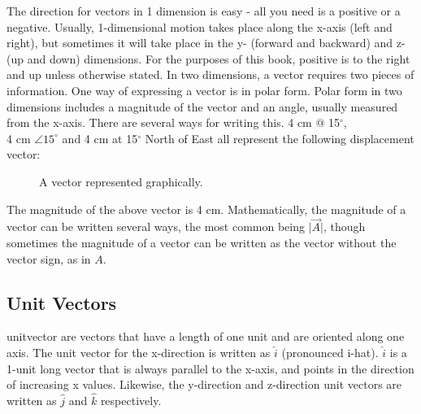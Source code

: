 The direction for vectors in 1 dimension is easy - all you need is a positive or a negative.  Usually, 1-dimensional motion takes place along the x-axis (left and right), but sometimes it will take place in the y- (forward and backward) and z- (up and down) dimensions.  For the purposes of this book, positive is to the right and up unless otherwise stated. 
In two dimensions, a vector requires two pieces of information.  One way of expressing a vector is in polar form.  Polar form in two dimensions includes a magnitude of the vector and an angle, usually measured from the x-axis.  There are several ways for writing this.  4 cm @ 15$^\circ$, \\ 4 cm $\angle 15^\circ$ and 4 cm at 15$^\circ$ North of East all represent the following displacement vector:



\begin{figure}[h]
	\caption{A vector represented graphically.} \label{figure:M1}
	\centering
	
\end{figure}


	
	
	



	
	The magnitude of the above vector is 4 cm.  Mathematically, the magnitude of a vector can be written several ways, the most common being $\lvert \vec{A} \rvert$, though sometimes the magnitude of a vector can be written as the vector without the vector sign, as in $A$. 
	
	\subsection{Unit Vectors}
	\gls{unitvector} are vectors that have a length of one unit and are oriented along one axis.  The unit vector for the x-direction is written as $\hat{i}$ (pronounced i-hat).  $\hat{i}$ is a 1-unit long vector that is always parallel to the x-axis, and points in the direction of increasing x values.  Likewise, the y-direction and z-direction unit vectors are written as $\hat{j}$ and $\hat{k}$ respectively.  
	
